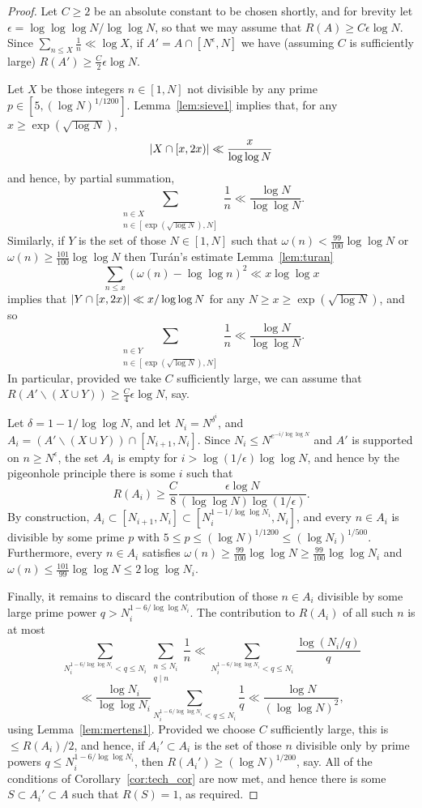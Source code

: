 \begin{proof}
  Let $C\geq 2$ be an absolute constant to be chosen shortly, and for brevity let $\epsilon = \log\log\log N/\log\log N$, so that we may assume that $R(A)\geq C\epsilon \log N$. Since $\sum_{n\leq X}\frac{1}{n}\ll \log X$, if $A'=A\cap [N^\epsilon,N]$ we have (assuming $C$ is sufficiently large) $R(A')\geq \frac{C}{2}\epsilon\log N$.

  Let $X$ be those integers $n\in [1,N]$ not divisible by any prime $p\in [5,(\log N)^{1/1200}]$. Lemma~\ref{lem:sieve1} implies that, for any $x\geq \exp(\sqrt{\log N})$,
  \[\left\lvert X\cap[x,2x)\right\rvert\ll \frac{x}{\log\log N}\]
  and hence, by partial summation,
  \[\sum_{\substack{n\in X\\ n\in [\exp(\sqrt{\log N}),N]}}\frac{1}{n}\ll \frac{\log N}{\log\log N}.\]
  Similarly, if $Y$ is the set of those $N\in [1,N]$ such that $\omega(n) <\frac{99}{100}\log\log N$ or $\omega(n)\geq \frac{101}{100}\log\log N$ then Tur\'{a}n's estimate Lemma~\ref{lem:turan}
  \[\sum_{n\leq x}(\omega(n)-\log\log n)^2\ll x\log\log x\]
  implies that $\left\lvert Y\cap [x,2x)\right\rvert\ll x/\log\log N$ for any $N\geq x\geq \exp(\sqrt{\log N})$, and so
  \[\sum_{\substack{n\in Y\\ n\in [\exp(\sqrt{\log N}),N]}}\frac{1}{n}\ll \frac{\log N}{\log\log N}.\]
  In particular, provided we take $C$ sufficiently large, we can assume that $R(A'\backslash (X\cup Y))\geq \frac{C}{4}\epsilon \log N$, say.

  Let $\delta=1-1/\log\log N$, and let $N_i=N^{\delta^i}$, and $A_i=(A'\backslash (X\cup Y))\cap [N_{i+1},N_i]$. Since $N_i\leq N^{e^{-i/\log\log N}}$ and $A'$ is supported on $n\geq N^\epsilon$, the set $A_i$ is empty for $i> \log(1/\epsilon)\log\log N$, and hence by the pigeonhole principle there is some $i$ such that
  \[R(A_i)\geq \frac{C}{8}\frac{\epsilon\log N}{(\log\log N)\log(1/\epsilon)}.\]
  By construction, $A_i\subset [N_{i+1},N_i]\subset [N_i^{1-1/\log\log N_i},N_i]$, and every $n\in A_i$ is divisible by some prime $p$ with $5\leq p\leq (\log N)^{1/1200}\leq (\log N_i)^{1/500}$. Furthermore, every $n\in A_i$ satisfies $\omega(n)\geq \frac{99}{100}\log\log N\geq \frac{99}{100}\log\log N_i$ and $\omega(n)\leq \frac{101}{99}\log\log N\leq 2\log\log N_i$.

  Finally, it remains to discard the contribution of those $n\in A_i$ divisible by some large prime power $q> N_i^{1-6/\log\log N_i}$. The contribution to $R(A_i)$ of all such $n$ is at most
\[
  \sum_{N_i^{1-6/\log\log N_i}< q\leq N_i}\sum_{\substack{n\leq N_i\\ q\mid n}}\frac{1}{n}
  \ll \sum_{N_i^{1-6/\log\log N_i}< q\leq N_i}\frac{\log(N_i/q)}{q}\]
  \[\ll \frac{\log N_i}{\log\log N_i}\sum_{N_i^{1-6/\log\log N_i}<q\leq N_i}\frac{1}{q}\ll \frac{\log N}{(\log\log N)^2},\]
  using Lemma~\ref{lem:mertens1}. Provided we choose $C$ sufficiently large, this is $\leq R(A_i)/2$, and hence, if $A_i'\subset A_i$ is the set of those $n$ divisible only by prime powers $q\leq N_i^{1-6/\log\log N_i}$, then $R(A_i')\geq (\log N)^{1/200}$, say. All of the conditions of Corollary~\ref{cor:tech_cor} are now met, and hence there is some $S\subset A_i'\subset A$ such that $R(S)=1$, as required.
\end{proof}


